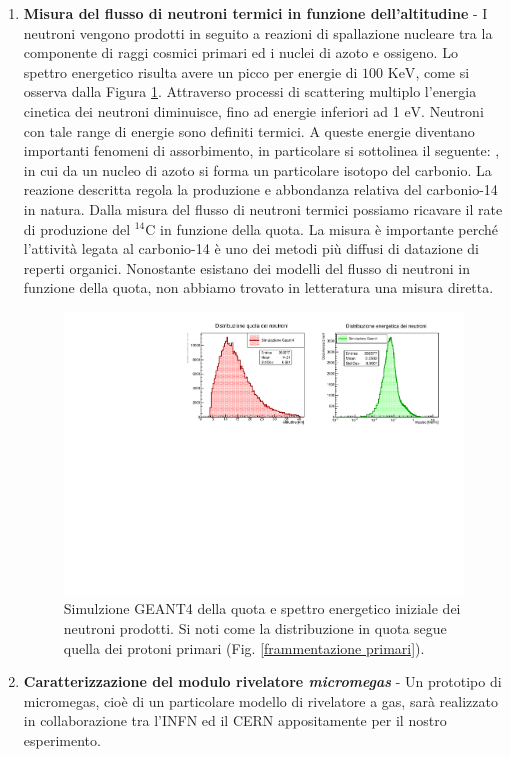 \begin{enumerate}
    \item \textbf{Misura del flusso di neutroni termici in funzione dell'altitudine} - I neutroni vengono prodotti in seguito a reazioni di spallazione nucleare tra la componente di raggi cosmici primari ed i nuclei di azoto e ossigeno. Lo spettro energetico risulta avere un picco per energie di $100\text{ KeV}$, come si osserva dalla Figura \ref{Neutroni}. Attraverso processi di scattering multiplo l'energia cinetica dei neutroni diminuisce, fino ad energie inferiori ad 1 $\text{eV}$. Neutroni con tale range di energie sono definiti termici. A queste energie diventano importanti fenomeni di assorbimento, in particolare si sottolinea il seguente:
, in cui da un nucleo di azoto si forma un particolare isotopo del carbonio. La reazione descritta regola la produzione e abbondanza relativa del carbonio-14 in natura. Dalla misura del flusso di neutroni termici possiamo ricavare il rate di produzione del $^{14}\text{C}$ in funzione della quota.
La misura è importante perché l'attività legata al carbonio-14 è uno dei metodi più diffusi di datazione di reperti organici. Nonostante esistano dei modelli del flusso di neutroni in funzione della quota, non abbiamo trovato in letteratura una misura diretta.

\begin{figure}
    \centering
    \includegraphics[width=.9\linewidth]{Neutroni.pdf}
    \caption{Simulzione GEANT4 della quota e spettro energetico iniziale dei neutroni prodotti. Si noti come la distribuzione in quota segue quella dei protoni primari (Fig. \ref{frammentazione primari}).}
    \label{Neutroni}
\end{figure}
    \item \textbf{Caratterizzazione del modulo rivelatore \emph{micromegas}} - Un prototipo di micromegas, cioè di un particolare modello di rivelatore a gas, sarà realizzato in collaborazione tra l'INFN ed il CERN appositamente per il nostro esperimento.


\end{enumerate}
